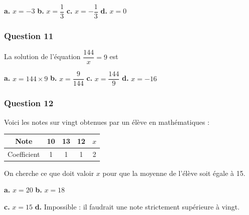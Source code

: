 \textbf{a.} $x = -3$ \hfill \textbf{b.} $x = \dfrac{1}{3}$ \hfill \textbf{c.} $x = -\dfrac{1}{3}$ \hfill \textbf{d.} $x = 0$

\subsubsection*{Question 11}
La solution de l'équation $\dfrac{144}{x} = 9$ est

\textbf{a.} $x = 144 \times 9$ \hfill \textbf{b.} $x = \dfrac{9}{144}$ \hfill \textbf{c.} $x = \dfrac{144}{9}$ \hfill \textbf{d.} $x = -16$

\subsubsection*{Question 12}
Voici les notes sur vingt obtenues par un élève en mathématiques :

\begin{center}
\begin{tabular}{|c|c|c|c|c|}
\hline
Note & 10 & 13 & 12 & $x$ \\
\hline
Coefficient & 1 & 1 & 1 & 2 \\
\hline
\end{tabular}
\end{center}

On cherche ce que doit valoir $x$ pour que la moyenne de l'élève soit égale à 15.

\textbf{a.} $x = 20$ \hfill \textbf{b.} $x = 18$

\textbf{c.} $x = 15$ \hfill \textbf{d.} Impossible : il faudrait une note strictement supérieure à vingt.
